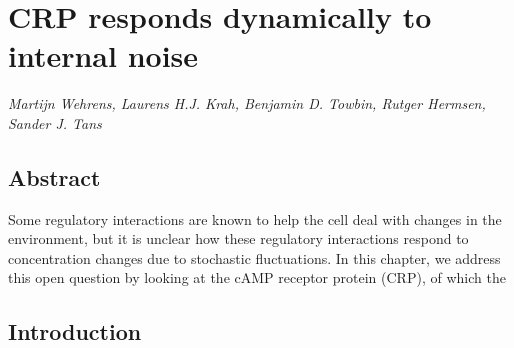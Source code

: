 





% 
%
% 



\chapter{CRP responds dynamically to internal noise}
\label{chapter:CRP}

\textit{Martijn Wehrens, Laurens H.J. Krah, Benjamin D. Towbin, Rutger Hermsen, Sander J. Tans}

\section*{Abstract}

Some regulatory interactions are known to help the cell deal with changes in the environment, but it is unclear how these regulatory interactions respond to concentration changes due to stochastic fluctuations.
%
In this chapter, we address this open question by looking at the cAMP receptor protein (CRP), of which the 

\thispagestyle{empty}
\clearpage

\section*{Introduction}


